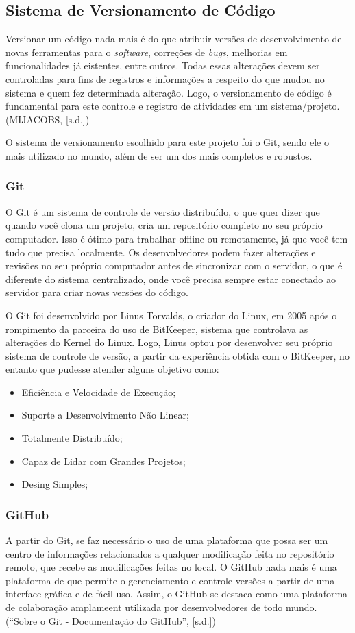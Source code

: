 \documentclass[a4paper,12pt]{article}
\begin{document}
\subsection{Sistema de Versionamento de Código}
Versionar um código nada mais é do que atribuir versões de desenvolvimento de novas ferramentas para o \textit{software}, correções de \textit{bugs}, 
melhorias em funcionalidades já eistentes, entre outros. Todas essas alterações devem ser controladas para fins de registros e informações a respeito do que mudou 
no sistema e quem fez determinada alteração. Logo, o versionamento de código é fundamental para este controle e 
registro de atividades em um sistema/projeto. (MIJACOBS, [s.d.])

O sistema de versionamento escolhido para este projeto foi o Git, sendo ele o mais utilizado no mundo, além de ser um dos mais completos e robustos.
\subsubsection{Git}
O Git é um sistema de controle de versão distribuído, o que quer dizer que quando você clona um projeto, cria um repositório completo no seu próprio computador. 
Isso é ótimo para trabalhar offline ou remotamente, já que você tem tudo que precisa localmente. Os desenvolvedores podem fazer alterações e revisões no seu próprio 
computador antes de sincronizar com o servidor, o que é diferente do sistema centralizado, onde você precisa sempre estar conectado ao servidor para criar 
novas versões do código. 

O Git foi desenvolvido por Linus Torvalds, o criador do Linux, em 2005 após o rompimento da parceira do uso de BitKeeper, sistema que controlava
as alterações do Kernel do Linux. Logo, Linus optou por desenvolver seu próprio sistema de controle de versão, a partir da experiência obtida com o BitKeeper, 
no entanto que pudesse atender alguns objetivo como:
\begin{itemize}
	\item Eficiência e Velocidade de Execução;
	\item Suporte a Desenvolvimento Não Linear;
	\item Totalmente Distribuído;
	\item Capaz de Lidar com Grandes Projetos;
	\item Desing Simples;
\end{itemize}


\subsubsection{GitHub}
A partir do Git, se faz necessário o uso de uma plataforma que possa ser um centro de informações relacionados a qualquer modificação feita no repositório remoto, 
que recebe as modificações feitas no local. O GitHub nada mais é uma plataforma de que permite o gerenciamento e controle versões a partir de uma interface gráfica 
e de fácil uso. Assim, o GitHub se destaca como uma plataforma de colaboração amplameent utilizada por desenvolvedores de todo mundo.
(“Sobre o Git - Documentação do GitHub”, [s.d.])
\end{document}
